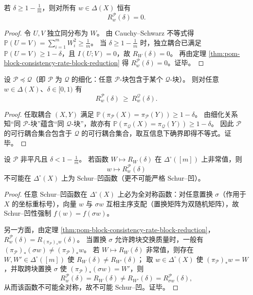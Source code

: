 \begin{corollary}[阈值零化]\label{cor:pom-block-consistency-rate-threshold-zero}
若 \(\delta\ge 1-\frac{1}{m}\)，则对所有 \(w\in\Delta(X)\) 恒有
\[
R^{\mathcal P}_w(\delta)=0.
\]
\end{corollary}
\begin{proof}
令 \(U,V\) 独立同分布为 \(W\)。
由 Cauchy--Schwarz 不等式得
\(
\mathbb{P}(U=V)=\sum_{i=1}^{m}W_i^2\ge \frac{1}{m}
\)。
当 \(\delta\ge 1-\frac{1}{m}\) 时，独立耦合已满足 \(\mathbb{P}(U=V)\ge 1-\delta\)，且 \(I(U;V)=0\)，故 \(R_W(\delta)=0\)。
再由定理 \ref{thm:pom-block-consistency-rate-block-reduction} 得 \(R^{\mathcal P}_w(\delta)=0\)。证毕。
\end{proof}

\begin{proposition}[分区细化的单调性]\label{prop:pom-block-consistency-rate-refinement-monotone}
设 \(\mathcal P\preceq\mathcal Q\)（即 \(\mathcal P\) 为 \(\mathcal Q\) 的细化：任意 \(\mathcal P\)-块包含于某个 \(\mathcal Q\)-块）。
则对任意 \(w\in\Delta(X)\)、\(\delta\in[0,1)\) 有
\[
R^{\mathcal P}_w(\delta)\ \ge\ R^{\mathcal Q}_w(\delta).
\]
\end{proposition}
\begin{proof}
任取耦合 \((X,Y)\) 满足 \(\mathbb{P}(\pi_{\mathcal P}(X)=\pi_{\mathcal P}(Y))\ge 1-\delta\)。
由细化关系知“同 \(\mathcal P\)-块”蕴含“同 \(\mathcal Q\)-块”，故亦有
\(\mathbb{P}(\pi_{\mathcal Q}(X)=\pi_{\mathcal Q}(Y))\ge 1-\delta\)。
因此 \(\mathcal P\) 的可行耦合集合包含于 \(\mathcal Q\) 的可行耦合集合，取互信息下确界即得不等式。证毕。
\end{proof}

\begin{theorem}\label{thm:pom-block-consistency-rate-schur-concavity-impossible}
设 \(\mathcal P\) 非平凡且 \(\delta<1-\frac1m\)。
若函数 \(W\mapsto R_W(\delta)\) 在 \(\Delta^\circ([m])\) 上非常值，则
\[
w\longmapsto R^{\mathcal P}_w(\delta)
\]
不可能在 \(\Delta^\circ(X)\) 上为 Schur--凹函数（更不可能严格 Schur--凹）。
\end{theorem}
\begin{proof}
任意 Schur--凹函数在 \(\Delta^\circ(X)\) 上必为全对称函数：对任意置换 \(\sigma\)（作用于 \(X\) 的坐标重标号），向量 \(w\) 与 \(\sigma w\) 互相主序支配（置换矩阵为双随机矩阵），故 Schur--凹性强制 \(f(w)=f(\sigma w)\)。
\par
另一方面，由定理 \ref{thm:pom-block-consistency-rate-block-reduction}，
\(
R^{\mathcal P}_w(\delta)=R_{(\pi_{\mathcal P})_*w}(\delta)
\)。
当置换 \(\sigma\) 允许跨块交换质量时，一般有
\((\pi_{\mathcal P})_*(\sigma w)\neq (\pi_{\mathcal P})_*w\)。
若 \(W\mapsto R_W(\delta)\) 非常值，则存在 \(W,W'\in\Delta^\circ([m])\) 使 \(R_W(\delta)\neq R_{W'}(\delta)\)；
取 \(w\in\Delta^\circ(X)\) 使 \((\pi_{\mathcal P})_*w=W\)，并取跨块置换 \(\sigma\) 使 \((\pi_{\mathcal P})_*(\sigma w)=W'\)，则
\[
R^{\mathcal P}_w(\delta)=R_W(\delta)\neq R_{W'}(\delta)=R^{\mathcal P}_{\sigma w}(\delta),
\]
从而该函数不可能全对称，故不可能 Schur--凹。证毕。
\end{proof}

